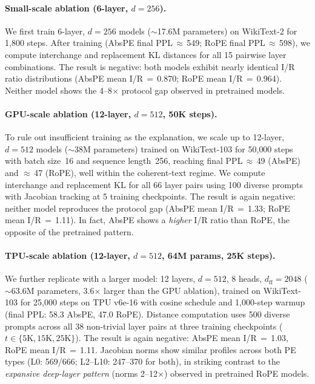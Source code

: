 \documentclass{article}
\begin{document}
\paragraph{Small-scale ablation (6-layer, $d{=}256$).}
We first train 6-layer, $d{=}256$ models (${\sim}$17.6M parameters) on WikiText-2 for 1,800 steps. After training (AbsPE final PPL$\,{\approx}\,$549; RoPE final PPL$\,{\approx}\,$598), we compute interchange and replacement KL distances for all 15 pairwise layer combinations. The result is negative: both models exhibit nearly identical I/R ratio distributions (AbsPE mean I/R$\,{=}\,$0.870; RoPE mean I/R$\,{=}\,$0.964). Neither model shows the 4--8$\times$ protocol gap observed in pretrained models.

\paragraph{GPU-scale ablation (12-layer, $d{=}512$, 50K steps).}
To rule out insufficient training as the explanation, we scale up to 12-layer, $d{=}512$ models (${\sim}$38M parameters) trained on WikiText-103 for 50{,}000 steps with batch size~16 and sequence length~256, reaching final PPL$\,{\approx}\,$49 (AbsPE) and ${\approx}\,$47 (RoPE), well within the coherent-text regime. We compute interchange and replacement KL for all 66 layer pairs using 100 diverse prompts with Jacobian tracking at 5 training checkpoints. The result is again negative: neither model reproduces the protocol gap (AbsPE mean I/R$\,{=}\,$1.33; RoPE mean I/R$\,{=}\,$1.11). In fact, AbsPE shows a \emph{higher} I/R ratio than RoPE, the opposite of the pretrained pattern.

\paragraph{TPU-scale ablation (12-layer, $d{=}512$, 64M params, 25K steps).}
We further replicate with a larger model: 12 layers, $d{=}512$, 8 heads, $d_\text{ff}{=}2048$ (${\sim}$63.6M parameters, 3.6$\times$ larger than the GPU ablation), trained on WikiText-103 for 25{,}000 steps on TPU v6e-16 with cosine schedule and 1{,}000-step warmup (final PPL: 58.3 AbsPE, 47.0 RoPE). Distance computation uses 500 diverse prompts across all 38 non-trivial layer pairs at three training checkpoints ($t \in \{5\text{K}, 15\text{K}, 25\text{K}\}$). The result is again negative: AbsPE mean I/R$\,{=}\,$1.03, RoPE mean I/R$\,{=}\,$1.11. Jacobian norms show similar profiles across both PE types (L0: 569/666; L2--L10: 247--370 for both), in striking contrast to the \emph{expansive deep-layer pattern} (norms 2--12$\times$) observed in pretrained RoPE models.
\end{document}
